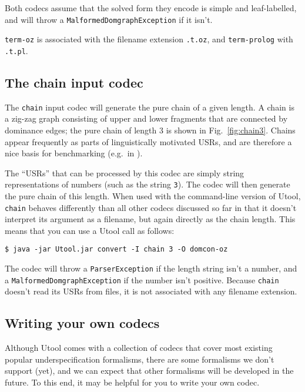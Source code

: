Both codecs assume that the solved form they encode is simple and
leaf-labelled, and will throw a \verb?MalformedDomgraphException? if
it isn't.

\verb?term-oz? is associated with the filename extension \verb?.t.oz?, and
\verb?term-prolog? with \verb?.t.pl?.





\subsection{The chain input codec}

The \verb?chain? input codec will generate the pure chain
\cite{Koller04} of a given length. A chain is a zig-zag graph
consisting of upper and lower fragments that are connected by
dominance edges; the pure chain of length 3 is shown in
Fig.~\ref{fig:chain3}. Chains appear frequently as parts of
linguistically motivated USRs, and are therefore a nice basis for
benchmarking (e.g.\ in \cite{bodirsky-weakly-normal-constraints}).

The ``USRs'' that can be processed by this codec are simply string
representations of numbers (such as the string \verb?3?). The codec
will then generate the pure chain of this length. When used with the
command-line version of Utool, \verb?chain? behaves differently than
all other codecs discussed so far in that it doesn't interpret its
argument as a filename, but again directly as the chain length. This
means that you can use a Utool call as follows:

\begin{verbatim}
$ java -jar Utool.jar convert -I chain 3 -O domcon-oz
\end{verbatim}

The codec will throw a \verb?ParserException? if the length string
isn't a number, and a \verb?MalformedDomgraphException? if the number
isn't positive. Because \verb?chain? doesn't read its USRs from files,
it is not associated with any filename extension.






\subsection{Writing your own codecs}

Although Utool comes with a collection of codecs that cover most
existing popular underspecification formalisms, there are some
formalisms we don't support (yet), and we can expect that other
formalisms will be developed in the future. To this end, it may be
helpful for you to write your own codec.

